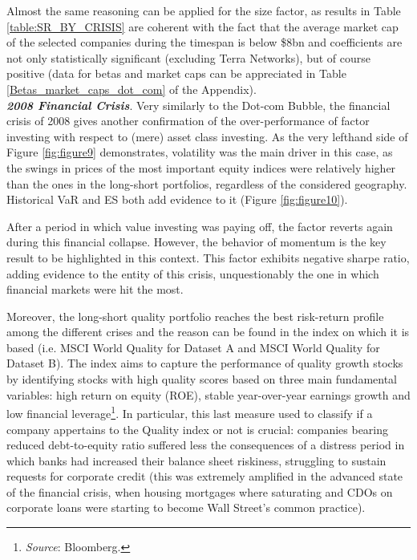\documentclass[12pt]{article}
\begin{document}
Almost the same reasoning can be applied for the size factor, as results in Table \ref{table:SR_BY_CRISIS} are coherent with the fact that the average market cap of the selected companies during the timespan is below \$8bn and coefficients are not only statistically significant (excluding Terra Networks), but of course positive (data for betas and market caps can be appreciated in Table \ref{Betas_market_caps_dot_com} of the Appendix). \\

\textit{\textbf{2008 Financial Crisis}}. Very similarly to the Dot-com Bubble, the financial crisis of 2008 gives another confirmation of the over-performance of factor investing with respect to (mere) asset class investing. As the very lefthand side of Figure \ref{fig:figure9} demonstrates, volatility was the main driver in this case, as the swings in prices of the most important equity indices were relatively higher than the ones in the long-short portfolios, regardless of the considered geography. Historical VaR and ES both add evidence to it (Figure \ref{fig:figure10}).

After a period in which value investing was paying off, the factor reverts again during this financial collapse. However, the behavior of momentum is the key result to be highlighted in this context. This factor exhibits negative sharpe ratio, adding evidence to the entity of this crisis, unquestionably the one in which financial markets were hit the most. 

Moreover, the long-short quality portfolio reaches the best risk-return profile among the different crises and the reason can be found in the index on which it is based (i.e. MSCI World Quality for Dataset A and MSCI World Quality for Dataset B). The index aims to capture the performance of quality growth stocks by identifying stocks with high quality scores based on three main fundamental variables: high return on equity (ROE), stable year-over-year earnings growth and low financial leverage\footnote{\textit{Source}: Bloomberg.}. In particular, this last measure used to classify if a company appertains to the Quality index or not is crucial: companies bearing reduced debt-to-equity ratio suffered less the consequences of a distress period in which banks had increased their balance sheet riskiness, struggling to sustain requests for corporate credit (this was extremely amplified in the advanced state of the financial crisis, when housing mortgages where saturating and CDOs on corporate loans were starting to become Wall Street's common practice).
\end{document}
